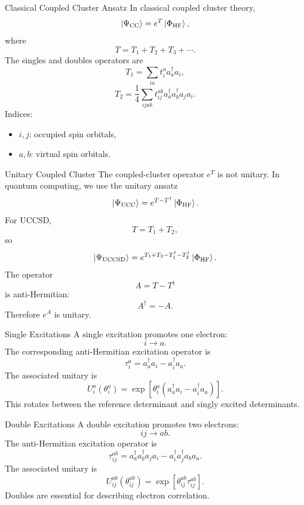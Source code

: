 \documentclass[aspectratio=169]{beamer}
\begin{document}
\begin{frame}{Classical Coupled Cluster Ansatz}
In classical coupled cluster theory,
\[
\ket{\Psi_{\mathrm{CC}}}
=
e^T
\ket{\Phi_{\mathrm{HF}}},
\]
where
\[
T = T_1 + T_2 + T_3 + \cdots .
\]
\vspace{0.3cm}
The singles and doubles operators are
\[
T_1
=
\sum_{ia}
t_i^a
a_a^\dagger a_i ,
\]
\[
T_2
=
\frac{1}{4}
\sum_{ijab}
t_{ij}^{ab}
a_a^\dagger a_b^\dagger a_j a_i .
\]
\vspace{0.3cm}
Indices:
\begin{itemize}
\item \(i,j\): occupied spin orbitals,
\item \(a,b\): virtual spin orbitals.
\end{itemize}
\end{frame}
\begin{frame}{Unitary Coupled Cluster}
The coupled-cluster operator \(e^T\) is not unitary.
\vspace{0.3cm}
In quantum computing, we use the unitary ansatz
\[
\ket{\Psi_{\mathrm{UCC}}}
=
e^{T-T^\dagger}
\ket{\Phi_{\mathrm{HF}}}.
\]
\vspace{0.3cm}
For UCCSD,
\[
T = T_1 + T_2,
\]
so
\[
\ket{\Psi_{\mathrm{UCCSD}}}
=
e^{T_1+T_2-T_1^\dagger-T_2^\dagger}
\ket{\Phi_{\mathrm{HF}}}.
\]
\vspace{0.3cm}
The operator
\[
A = T - T^\dagger
\]
is anti-Hermitian:
\[
A^\dagger = -A.
\]
Therefore \(e^A\) is unitary.
\end{frame}
\begin{frame}{Single Excitations}
A single excitation promotes one electron:
\[
i \rightarrow a.
\]
The corresponding anti-Hermitian excitation operator is
\[
\tau_i^a
=
a_a^\dagger a_i
-
a_i^\dagger a_a .
\]
The associated unitary is
\[
U_i^a(\theta_i^a)
=
\exp\left[
\theta_i^a
\left(
a_a^\dagger a_i
-
a_i^\dagger a_a
\right)
\right].
\]
\vspace{0.3cm}
This rotates between the reference determinant and singly excited determinants.
\end{frame}
\begin{frame}{Double Excitations}
A double excitation promotes two electrons:
\[
ij \rightarrow ab.
\]
The anti-Hermitian excitation operator is
\[
\tau_{ij}^{ab}
=
a_a^\dagger a_b^\dagger a_j a_i
-
a_i^\dagger a_j^\dagger a_b a_a .
\]
The associated unitary is
\[
U_{ij}^{ab}(\theta_{ij}^{ab})
=
\exp\left[
\theta_{ij}^{ab}
\tau_{ij}^{ab}
\right].
\]
\vspace{0.3cm}
Doubles are essential for describing electron correlation.
\end{frame}
\end{document}
